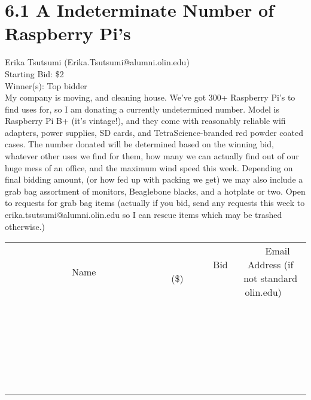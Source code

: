\documentclass[11pt]{article}
\begin{document}
					\section*{6.1 A Indeterminate Number of Raspberry Pi's}
					Erika Tsutsumi (Erika.Tsutsumi@alumni.olin.edu) \\
					Starting Bid: \$2 \\
					Winner(s): Top bidder \\
					My company is moving, and cleaning house. We've got 300+ Raspberry Pi's to find uses for, so I am donating a currently undetermined number. Model is Raspberry Pi B+ (it's vintage!), and they come with reasonably reliable wifi adapters, power supplies, SD cards, and TetraScience-branded red powder coated cases. The number donated will be determined based on the winning bid, whatever other uses we find for them, how many we can actually find out of our huge mess of an office, and the maximum wind speed this week. Depending on final bidding amount, (or how fed up with packing we get) we may also include a grab bag assortment of monitors, Beaglebone blacks, and a hotplate or two. Open to requests for grab bag items (actually if you bid, send any requests this week to erika.tsutsumi@alumni.olin.edu so I can rescue items which may be trashed otherwise.) \\
					[6ex]
					\begin{tabular}{c c c}
						~~~~~~~~~~~~~Name~~~~~~~~~~~~~ & ~~~~~~~~~Bid (\$)~~~~~~~~~ & ~~~Email Address (if not standard olin.edu)~~~ \\
				
 & & \\
\hline
 & & \\
\hline
 & & \\
\hline
 & & \\
\hline
 & & \\
\hline
 & & \\
\hline
 & & \\
\hline
 & & \\
\hline
 & & \\
\hline
 & & \\
\hline
 & & \\
\hline
 & & \\
\hline
 & & \\
\hline
 & & \\
\hline
 & & \\
\hline
 & & \\
\hline
 & & \\
\hline
 & & \\
\hline
 & & \\
\hline
 & & \\
\hline
 & & \\
\hline
 & & \\
\hline
 & & \\
\hline
 & & \\
\hline
 & & \\
\hline
 & & \\
\hline
					\end{tabular}
					\clearpage
				
\end{document}
